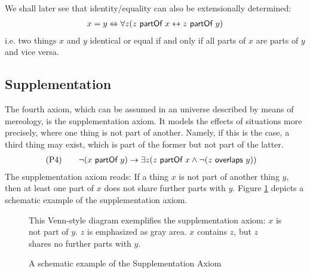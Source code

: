 We shall later see that identity/equality can also be extensionally determined:
\begin{align}
x = y
\Leftrightarrow
\forall z (z ~\textsf{partOf}~ x \leftrightarrow z ~\textsf{partOf}~ y)
\end{align}
i.e. two things $x$ and $y$ identical or equal if and only if all parts of $x$ are parts of $y$ and vice versa.

\subsection{Supplementation}
\label{subsection:Supplementation}
The fourth axiom, which can be assumed in an universe described by means of mereology, is the supplementation axiom.
It models the effects of situations more precisely, where one thing is not part of another.
Namely, if this is the case, a third thing may exist, which is part of the former but not part of the latter.
\begin{align}
&\text{(P4)}
\qquad
\neg(x ~\textsf{partOf}~ y) \rightarrow \exists z (z ~\textsf{partOf}~ x \wedge \neg(z ~\textsf{overlaps}~ y))
\end{align}
The supplementation axiom reads:
If a thing $x$ is not part of another thing $y$, then at least one part of $x$ does not share further parts with $y$.
Figure \ref{figure:SupplementaitonAxiomExample} depicts a schematic example of the supplementation axiom.

\begin{figure}[h!]
\begin{center}
\end{center}
{
\scriptsize 
This Venn-style diagram exemplifies the supplementation axiom:
$x$ is not part of $y$.
$z$ is emphasized as gray area.
$x$ contains $z$, but $z$ shares no further parts with $y$.
}
\caption{A schematic example of the Supplementation Axiom}
\label{figure:SupplementaitonAxiomExample}
\end{figure}


